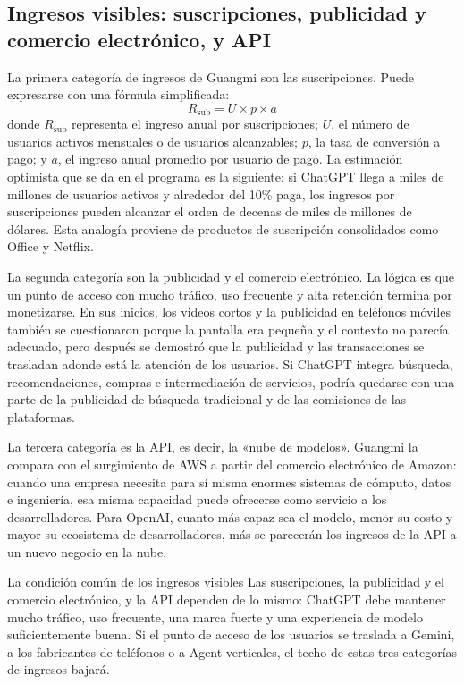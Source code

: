 \documentclass[a4paper]{article}
\begin{document}
\subsection{Ingresos visibles: suscripciones, publicidad y comercio electrónico, y API}

La primera categoría de ingresos de Guangmi son las suscripciones. Puede expresarse con una fórmula simplificada:
\[
R_{\text{sub}} = U \times p \times a
\]
donde \(R_{\text{sub}}\) representa el ingreso anual por suscripciones; \(U\), el número de usuarios activos mensuales o de usuarios alcanzables; \(p\), la tasa de conversión a pago; y \(a\), el ingreso anual promedio por usuario de pago. La estimación optimista que se da en el programa es la siguiente: si ChatGPT llega a miles de millones de usuarios activos y alrededor del 10\% paga, los ingresos por suscripciones pueden alcanzar el orden de decenas de miles de millones de dólares. Esta analogía proviene de productos de suscripción consolidados como Office y Netflix.

La segunda categoría son la publicidad y el comercio electrónico. La lógica es que un punto de acceso con mucho tráfico, uso frecuente y alta retención termina por monetizarse. En sus inicios, los videos cortos y la publicidad en teléfonos móviles también se cuestionaron porque la pantalla era pequeña y el contexto no parecía adecuado, pero después se demostró que la publicidad y las transacciones se trasladan adonde está la atención de los usuarios. Si ChatGPT integra búsqueda, recomendaciones, compras e intermediación de servicios, podría quedarse con una parte de la publicidad de búsqueda tradicional y de las comisiones de las plataformas.

La tercera categoría es la API, es decir, la «nube de modelos». Guangmi la compara con el surgimiento de AWS a partir del comercio electrónico de Amazon: cuando una empresa necesita para sí misma enormes sistemas de cómputo, datos e ingeniería, esa misma capacidad puede ofrecerse como servicio a los desarrolladores. Para OpenAI, cuanto más capaz sea el modelo, menor su costo y mayor su ecosistema de desarrolladores, más se parecerán los ingresos de la API a un nuevo negocio en la nube.

\begin{importantbox}{La condición común de los ingresos visibles}
Las suscripciones, la publicidad y el comercio electrónico, y la API dependen de lo mismo: ChatGPT debe mantener mucho tráfico, uso frecuente, una marca fuerte y una experiencia de modelo suficientemente buena. Si el punto de acceso de los usuarios se traslada a Gemini, a los fabricantes de teléfonos o a Agent verticales, el techo de estas tres categorías de ingresos bajará.
\end{importantbox}
\end{document}
